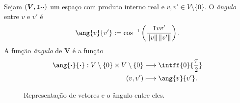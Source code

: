 \begin{defi}
Sejam $(\bm V,\mathtt I{\bm{\cdot}}{\bm{\cdot}})$ um espaço com produto interno real e $v,v' \in V \setminus \{0\}$. O \emph{ângulo} entre $v$ e $v'$ é
	\begin{equation*}
	\ang{v}{v'} := \cos\inv\left(\frac{\inte{v}{v'}}{\nor{v}\nor{v'}}\right).
	\end{equation*}
A função \emph{ângulo} de $\bm V$ é a função
	\begin{align*}
	\func{\ang{\var}{\var}}{V\setminus\{0\} \times V\setminus\{0\}}{\intff{0}{\frac{\tau}{2}}}{(v,v')}{\ang{v}{v'}}.
	\end{align*}
\end{defi}

\begin{figure}
\centering
{}
\caption{Representação de vetores e o ângulo entre eles.}
\label{fig:angulovetores}
\end{figure}

